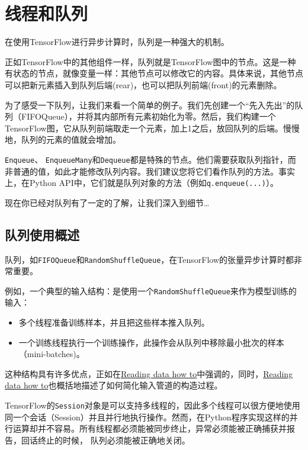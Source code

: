 

\section{线程和队列 }\label{ux7ebfux7a0bux548cux961fux5217}

在使用TensorFlow进行异步计算时，队列是一种强大的机制。

正如TensorFlow中的其他组件一样，队列就是TensorFlow图中的节点。这是一种有状态的节点，就像变量一样：其他节点可以修改它的内容。具体来说，其他节点可以把新元素插入到队列后端(rear)，也可以把队列前端(front)的元素删除。

为了感受一下队列，让我们来看一个简单的例子。我们先创建一个``先入先出''的队列（FIFOQueue），并将其内部所有元素初始化为零。然后，我们构建一个TensorFlow图，它从队列前端取走一个元素，加上1之后，放回队列的后端。慢慢地，队列的元素的值就会增加。

\texttt{Enqueue}、
\texttt{EnqueueMany}和\texttt{Dequeue}都是特殊的节点。他们需要获取队列指针，而非普通的值，如此才能修改队列内容。我们建议您将它们看作队列的方法。事实上，在Python
API中，它们就是队列对象的方法（例如\texttt{q.enqueue(...)}）。

现在你已经对队列有了一定的了解，让我们深入到细节\ldots{}

\subsection{队列使用概述 }\label{ux961fux5217ux4f7fux7528ux6982ux8ff0}

队列，如\texttt{FIFOQueue}和\texttt{RandomShuffleQueue}，在TensorFlow的张量异步计算时都非常重要。

例如，一个典型的输入结构：是使用一个\texttt{RandomShuffleQueue}来作为模型训练的输入：

\begin{itemize}
\tightlist
\item
  多个线程准备训练样本，并且把这些样本推入队列。
\item
  一个训练线程执行一个训练操作，此操作会从队列中移除最小批次的样本（mini-batches)。
\end{itemize}

这种结构具有许多优点，正如在\href{../reading_data}{Reading data how
to}中强调的，同时，\href{../reading_data}{Reading data how
to}也概括地描述了如何简化输入管道的构造过程。

TensorFlow的\texttt{Session}对象是可以支持多线程的，因此多个线程可以很方便地使用同一个会话（Session）并且并行地执行操作。然而，在Python程序实现这样的并行运算却并不容易。所有线程都必须能被同步终止，异常必须能被正确捕获并报告，回话终止的时候，
队列必须能被正确地关闭。

